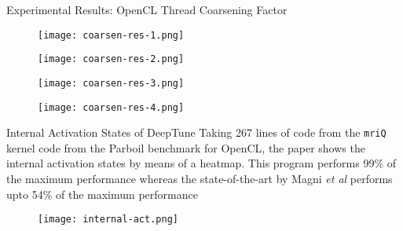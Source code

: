 \documentclass[10pt]{beamer}
\begin{document}
\begin{frame}{Experimental Results: OpenCL Thread Coarsening Factor}
\begin{minipage}{0.475\linewidth}
\begin{figure}[H]
\centering
\texttt{[image: coarsen-res-1.png]}
\end{figure}
\end{minipage}
\hfill
\begin{minipage}{0.475\linewidth}
\begin{figure}[H]
\centering
\texttt{[image: coarsen-res-2.png]}
\end{figure}
\end{minipage}
\vspace{-2mm}
\begin{minipage}{0.475\linewidth}
\begin{figure}[H]
\centering
\texttt{[image: coarsen-res-3.png]}
\end{figure}
\end{minipage}
\hfill
\begin{minipage}{0.475\linewidth}
\begin{figure}[H]
\centering
\texttt{[image: coarsen-res-4.png]}
\end{figure}
\end{minipage}
\end{frame}

\begin{frame}{Internal Activation States of DeepTune}
Taking 267 lines of code from the \texttt{mriQ} kernel code from the Parboil benchmark for OpenCL, the paper shows the internal activation states by means of a heatmap. This program performs 99\% of the maximum performance whereas the state-of-the-art by Magni \textit{et al} performs upto 54\% of the maximum performance
\vspace{-2mm}
\begin{figure}[H]
\centering
\texttt{[image: internal-act.png]}
\end{figure}
\end{frame}
\end{document}
